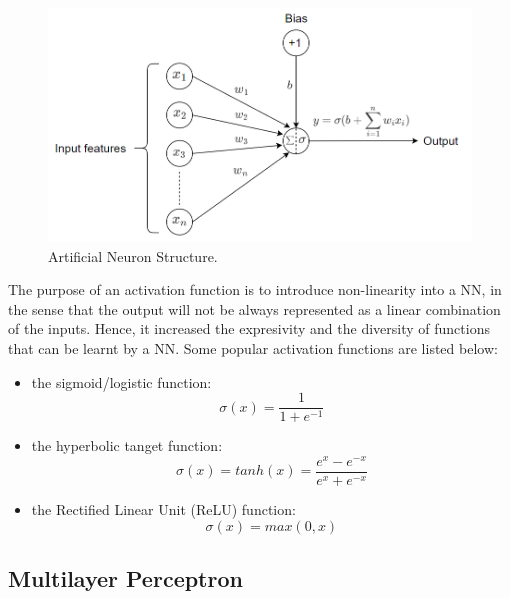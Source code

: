 \begin{figure}[H]
  \centering
  \includegraphics[scale = 0.5]{Images/artificial_neuron.png}
  \caption{Artificial Neuron Structure.}
  \label{Artificial Neuron}
\end{figure}

The purpose of an activation function is to introduce non-linearity into a NN, in the sense that the output will not be always represented as a linear combination of the inputs. Hence, it increased the expresivity and the diversity of functions that can be learnt by a NN. Some popular activation functions are listed below:\\

\begin{itemize}
  \item the sigmoid/logistic function: \\
        \begin{equation}
          \sigma(x) = \frac{1}{1 + e^{-1}}
        \end{equation}

  \item the hyperbolic tanget function: \\
        \begin{equation}
          \sigma(x) = tanh(x) = \frac{e^{x} - e^{-x}}{e^{x} + e^{-x}}
        \end{equation}

  \item the Rectified Linear Unit (ReLU) function: \\
        \begin{equation}
          \sigma(x) = max(0,x)
        \end{equation}
\end{itemize}


\subsection{Multilayer Perceptron}


